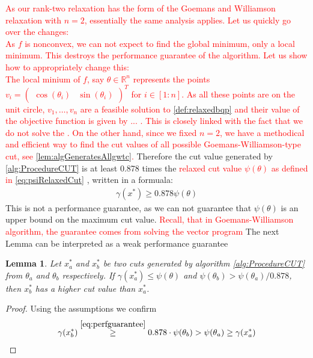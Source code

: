 \documentclass[12pt,a4paper]{article}
\theoremstyle{mythm}
\newtheorem{lem}[thm]{Lemma}
\begin{document}
\textcolor{red}{As our rank-two relaxation has the form of the Goemans and Williamson relaxation with $ n=2 $, essentially the same analysis applies.}
\textcolor{red}{Let us quickly go over the changes: \\
As $ f $ is nonconvex, we can not expect to find the global minimum, only a local minimum.
This destroys the performance guarantee of the algorithm.
Let us show how to appropriately change this: \\
The local minium of $ f $, say $ \theta \in \mathbb{R} ^{ n } $ represents the points 
$
v_i =
\begin{pmatrix}
\cos( \theta_i ) &
\sin( \theta_i ) 
\end{pmatrix} ^{ T }  
$ for $ i \in \left[ 1:n \right]  $.
As all these points are on the unit circle, $ v_1 , \dots, v_n $ are a feasible solution to \ref{def:relaxedbqp} and their value of the objective function is given by ...
.
This is closely linked with the fact that we do not solve the \SDP.
On the other hand, since we fixed $ n = 2 $, we have a methodical and efficient way to find the cut values of all possible Goemans-Williamson-type cut, see
\ref{lem:algGeneratesAllgwtc}.
}
Therefore the cut value generated by \ref{alg:ProcedureCUT} is at least 0.878 times the \textcolor{red}{relaxed cut value $ \psi (\theta) $ as defined in
\ref{eq:psiRelaxedCut} }, written in a formuala:
\begin{align}
\label{eq:perfguarantee} 
\gamma (x^*) \geq 0.878 \psi (\theta) 
\end{align} 
This is not a performance guarantee, as we can not guarantee that $ \psi ( \theta)  $ is an upper bound on the maximum cut value.
\textcolor{red}{Recall, that in Goemans-Williamson algorithm, the guarantee comes from solving the \textcolor{red}{vector program}}
The next Lemma can be interpreted as a weak performance guarantee
\begin{lem}
Let $ x ^{*} _{ a } $ and $ x ^{*} _{ b } $ be two cuts generated by algorithm \ref{alg:ProcedureCUT} from $ \theta_a $ and $ \theta_b $ respectively.
If $ \gamma ( x ^{ * } _{ a } ) \leq \psi ( \theta) $ and $ \psi ( \theta _{ b } ) > \psi ( \theta_a)/0.878 $, then $ x ^{ * } _{ b }  $ has a higher cut value than $ x ^{ * }
_{ a }  $.
\end{lem} 
\begin{proof}
Using the assumptions we confirm
\begin{align*}
\gamma ( x ^{ * } _{ b } ) \overset{ \ref{eq:perfguarantee}  }{ \geq  } 0.878 \cdot \psi ( \theta_b) > \psi ( \theta_a) \geq \gamma ( x ^{ * } _{ a } ) 
\end{align*} 
\end{proof}
\end{document}
